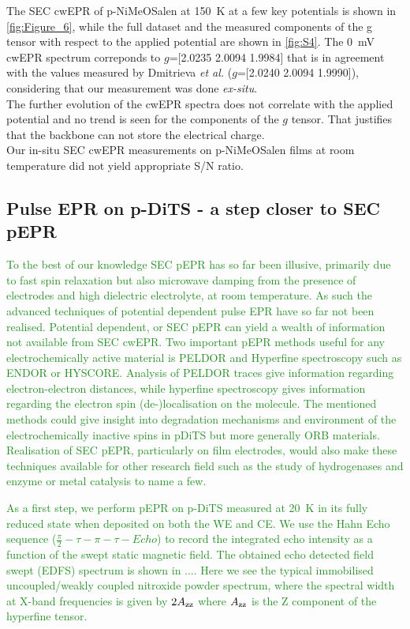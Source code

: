 \documentclass{WileyMSP-template}
\newcommand{\np}[1]{\textcolor{ForestGreen}{#1}}
\begin{document}
\bigbreak

The SEC cwEPR of p-NiMeOSalen at 150~K at a few key potentials is shown in \ref{fig:Figure_6}, while the full dataset and the measured components of the g tensor with respect to the applied potential are shown in \ref{fig:S4}. The 0~mV cwEPR spectrum correponds to $g$=[2.0235 2.0094 1.9984] that is in agreement with the values measured by Dmitrieva \textit{et al.} ($g$=[2.0240 2.0094 1.9990]), considering that our measurement was done \textit{ex-situ}.\\
The further evolution of the cwEPR spectra does not correlate with the applied potential and no trend is seen for the components of the $g$ tensor. That justifies that the backbone can not store the electrical charge.\\
Our in-situ SEC cwEPR measurements on p-NiMeOSalen films at room temperature did not yield appropriate S/N ratio.\\

\bigbreak

\subsection{Pulse EPR on p-DiTS - a step closer to SEC pEPR}

\bigbreak

\np{To the best of our knowledge SEC pEPR has so far been illusive, primarily due to fast spin relaxation but also microwave damping from the presence of electrodes and high dielectric electrolyte, at room temperature. As such the advanced techniques of potential dependent pulse EPR have so far not been realised. Potential dependent, or SEC pEPR can yield a wealth of information not available from SEC cwEPR. Two important pEPR methods useful for any electrochemically active material is PELDOR and Hyperfine spectroscopy such as ENDOR or HYSCORE. Analysis of PELDOR traces give information regarding electron-electron distances, while hyperfine spectroscopy gives information regarding the electron spin (de-)localisation on the molecule. The mentioned methods could give insight into degradation mechanisms and environment of the electrochemically inactive spins in pDiTS but more generally ORB materials. Realisation of SEC pEPR, particularly on film electrodes, would also make these techniques available for other research field such as the study of hydrogenases and enzyme or metal catalysis to name a few.}

\bigbreak

\np{As a first step, we perform pEPR on p-DiTS measured at 20~K in its fully reduced state when deposited on both the WE and CE. We use the Hahn Echo sequence ($\frac{\pi}{2} - \tau - \pi - \tau - Echo$) to record the integrated echo intensity as a function of the swept static magnetic field. The obtained echo detected field swept (EDFS) spectrum is shown in .... Here we see the typical immobilised uncoupled/weakly coupled nitroxide powder spectrum, where the spectral width at X-band frequencies is given by $2A\textsubscript{zz}$ where $A\textsubscript{zz}$ is the Z component of the hyperfine tensor.}
\end{document}
